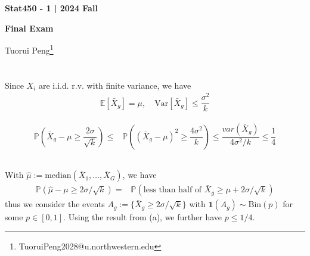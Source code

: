 \documentclass[11pt,a4paper]{article}
\numberwithin{equation}{section}%
\begin{document}
\begin{center}\thispagestyle{plain}

{\LARGE\textbf{Stat450 - 1 | 2024 Fall}}

{\Large\textbf{Final Exam}}

Tuorui Peng\footnote{TuoruiPeng2028@u.northwestern.edu}
\end{center}

\thispagestyle{myheadings}
\pagestyle{myheadings}





  


\section{}

\subsection{}

Since $ X_i $ are i.i.d. r.v. with finite variance, we have
\begin{align*}
    \mathbb{E}\left[ \bar{X} _g\right] = \mu, \quad \text{Var}\left[ \bar{X} _g\right] \leq \dfrac{ \sigma ^2 }{ k }  
\end{align*}


\begin{align*}
    \mathbb{P}\left( \bar{X}_g -\mu \geq \dfrac{ 2\sigma  }{ \sqrt{k} }  \right) \leq & \mathbb{P}\left( (\bar{X}_g -\mu)^2 \geq \dfrac{ 4\sigma ^2 }{ k }  \right)   
    \leq  \dfrac{ var(\bar{X}_g) }{ 4\sigma ^2/k }
    \leq \dfrac{ 1 }{ 4 }  
\end{align*}

\subsection{}
With $ \hat{\mu }:= \mathrm{ median }(\bar{X}_1,\ldots,\bar{X}_G)  $, we have
\begin{align*}
    \mathbb{P}\left( \hat{\mu }-\mu \geq 2\sigma /\sqrt{k} \right) =& \mathbb{P}\left( \text{less than half of }\bar{X}_g \geq \mu +2\sigma /\sqrt{k} \right) 
\end{align*}
thus we consider the events $ A_g:= \{\bar{X}_g \geq 2\sigma /\sqrt{k}\} $ with $ \mathbf{1}(A_g) \sim \mathrm{Bin}(p) $ for some $ p\in[0,1] $. Using the result from (a), we further have $ p\leq 1/4 $.
\end{document}
